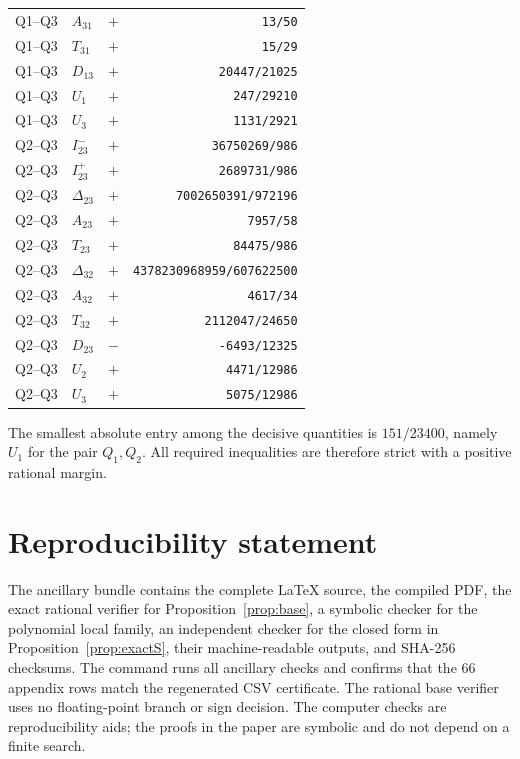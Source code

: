 \documentclass[11pt]{article}
\theoremstyle{plain}
\theoremstyle{definition}
\theoremstyle{remark}
\newcommand{\1}{\mathbf 1}
\begin{document}
\begin{longtable}{@{}llcr@{}}
Q1--Q3 & $A_{31}$ & $+$ & \texttt{13/50} \\
Q1--Q3 & $T_{31}$ & $+$ & \texttt{15/29} \\
Q1--Q3 & $D_{13}$ & $+$ & \texttt{20447/21025} \\
Q1--Q3 & $U_{1}$ & $+$ & \texttt{247/29210} \\
Q1--Q3 & $U_{3}$ & $+$ & \texttt{1131/2921} \\
\addlinespace
Q2--Q3 & $I^-_{23}$ & $+$ & \texttt{36750269/986} \\
Q2--Q3 & $I^+_{23}$ & $+$ & \texttt{2689731/986} \\
Q2--Q3 & $\Delta_{23}$ & $+$ & \texttt{7002650391/972196} \\
Q2--Q3 & $A_{23}$ & $+$ & \texttt{7957/58} \\
Q2--Q3 & $T_{23}$ & $+$ & \texttt{84475/986} \\
Q2--Q3 & $\Delta_{32}$ & $+$ & \texttt{4378230968959/607622500} \\
Q2--Q3 & $A_{32}$ & $+$ & \texttt{4617/34} \\
Q2--Q3 & $T_{32}$ & $+$ & \texttt{2112047/24650} \\
Q2--Q3 & $D_{23}$ & $-$ & \texttt{-6493/12325} \\
Q2--Q3 & $U_{2}$ & $+$ & \texttt{4471/12986} \\
Q2--Q3 & $U_{3}$ & $+$ & \texttt{5075/12986} \\
\end{longtable}
\endgroup

The smallest absolute entry among the decisive quantities is
$151/23400$, namely $U_1$ for the pair $Q_1,Q_2$.  All required inequalities
are therefore strict with a positive rational margin.

\section*{Reproducibility statement}

The ancillary bundle contains the complete \LaTeX{} source, the compiled PDF,
the exact rational verifier for Proposition~\ref{prop:base}, a symbolic
checker for the polynomial local family, an independent checker for the
closed form in Proposition~\ref{prop:exactS}, their machine-readable outputs,
and SHA-256 checksums.  The command
 runs all ancillary checks and confirms
that the $66$ appendix rows match the regenerated CSV certificate.  The
rational base verifier uses no floating-point branch or sign decision.  The
computer checks are reproducibility aids; the proofs in the paper are symbolic
and do not depend on a finite search.
\end{document}
